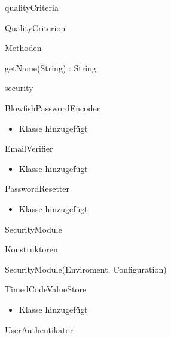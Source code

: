\documentclass[parskip=full]{scrartcl}
\begin{document}
\begin{itemPackage}
\begin{itemClass}
\begin{itemClassSub}
\begin{itemPlus}
\end{itemPlus}
\end{itemClassSub}
\end{itemClass}
\item qualityCriteria
\begin{itemClass}
\item QualityCriterion
\begin{itemClassSub}
\item Methoden
\begin{itemPlus}
\item getName(String) : String
\end{itemPlus}
\end{itemClassSub}
\end{itemClass}
\item security
\begin{itemClass}
\item BlowfishPasswordEncoder
	\begin{itemize}
	  \item Klasse hinzugefügt
	\end{itemize}
\item EmailVerifier
\item \begin{itemize}
	  \item Klasse hinzugefügt
	\end{itemize}
\item PasswordResetter
\item \begin{itemize}
	  \item Klasse hinzugefügt
	\end{itemize}
\item SecurityModule
\begin{itemClassSub}
\item Konstruktoren
\begin{itemPlus}
\item SecurityModule(Enviroment, Configuration)
\end{itemPlus}
\end{itemClassSub}
\item TimedCodeValueStore
\item \begin{itemize}
	  \item Klasse hinzugefügt
	\end{itemize}
\item UserAuthentikator
\item \begin{itemize}

\end{itemize}
\end{itemClass}
\end{itemPackage}
\end{document}
